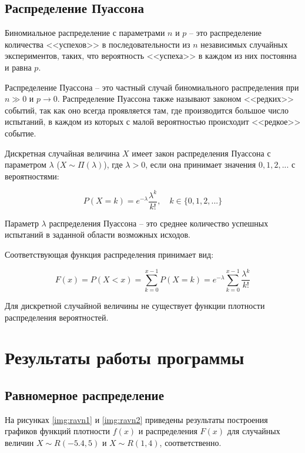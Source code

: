 \documentclass{bmstu}
\begin{document}
\section{Распределение Пуассона}

Биномиальное распределение с параметрами $n$ и $p$ -- это распределение количества <<успехов>> в последовательности из $n$ независимых случайных экспериментов, таких, что вероятность <<успеха>> в каждом из них постоянна и равна $p$.

Распределение Пуассона -- это частный случай биномиального распределения при $n \gg 0$ и $p \to 0$. Распределение Пуассона также называют законом <<редких>> событий, так как оно всегда проявляется там, где производится большое число испытаний, в каждом из которых с малой вероятностью происходит <<редкое>> событие.


Дискретная случайная величина $X$ имеет закон распределения Пуассона с параметром $\lambda$ ($X \sim \Pi(\lambda)$), где $\lambda > 0$, если она принимает значения $0, 1, 2,...$ с вероятностями:

\begin{equation}
	P(X = k)= e^{-\lambda}\frac{\lambda^{k}}{k!}, \quad k \in \{0, 1, 2, ...\}
\end{equation}


Параметр $\lambda$ распределения Пуассона -- это среднее количество успешных испытаний в заданной области возможных исходов. 


Соответствующая функция распределения принимает вид:

\begin{equation}
F(x) = P(X < x) = \sum_{k=0}^{x-1}P(X = k) = e^{-\lambda}\sum_{k=0}^{x-1}\frac{\lambda^{k}}{k!} 
\end{equation}

Для дискретной случайной величины не существует функции плотности распределения вероятностей. 


\chapter{Результаты работы программы}


\section{Равномерное распределение}

На рисунках \ref{img:ravn1} и \ref{img:ravn2} приведены результаты построения графиков функций плотности $f(x)$ и распределения $F(x)$ для случайных величин $X \sim R(-5.4, 5)$ и $X \sim R(1, 4)$, соответственно.
\end{document}
